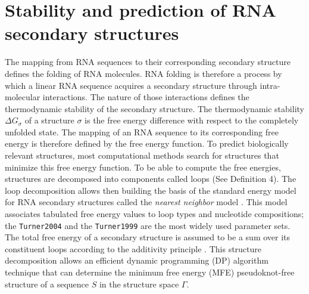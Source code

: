 \section{Stability and prediction of RNA secondary structures}

The mapping from RNA sequences to their corresponding secondary structure defines the folding of RNA molecules. RNA folding is therefore a process by which a linear RNA sequence acquires a secondary structure through intra-molecular interactions. The nature of those interactions defines the thermodynamic stability of the secondary structure.  The thermodynamic stability $\Delta G_{\sigma}$ of a structure $\sigma$ is the free energy difference with respect to the completely unfolded state. The mapping of an RNA sequence to its corresponding free energy is therefore defined by the free energy function.
To predict biologically relevant structures, most computational methods search for structures that minimize this free energy function. To be able to compute the free energies, structures are decomposed into components called loops (See Definition 4).  The loop decomposition allows then building the basis of the standard energy model for RNA secondary structures called the \textit{nearest neighbor} model \cite{turner09_nndb}. This model associates tabulated free energy values to loop types and nucleotide compositions; the \texttt{Turner2004} \cite{mathews2004incorporating}  and the \texttt{Turner1999} are the most widely used parameter sets.  The total free energy of a secondary structure is assumed to be a sum over its constituent loops according to the additivity principle \cite{dill97_addit_princ_bioch}. This structure decomposition allows an efficient dynamic programming (DP) algorithm technique that can determine the minimum free energy (MFE) pseudoknot-free structure of a sequence $S$ in the structure space $\Gamma$. 

